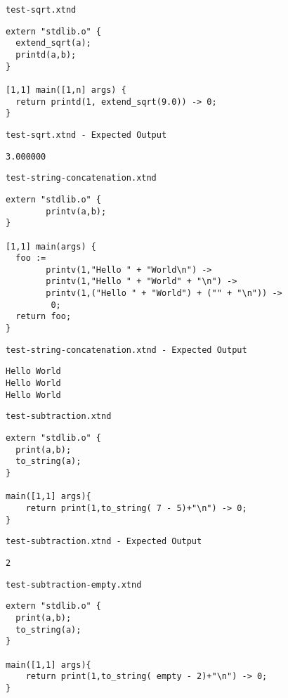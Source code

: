 \medskip \noindent \texttt{test-sqrt.xtnd}


\begin{lstlisting}
extern "stdlib.o" {
  extend_sqrt(a);
  printd(a,b);
}

[1,1] main([1,n] args) {
  return printd(1, extend_sqrt(9.0)) -> 0;
}
\end{lstlisting}


\medskip \noindent \texttt{test-sqrt.xtnd - Expected Output}


\begin{lstlisting}
3.000000
\end{lstlisting}


\medskip \noindent \texttt{test-string-concatenation.xtnd}


\begin{lstlisting}
extern "stdlib.o" {
		printv(a,b);
}

[1,1] main(args) {
  foo :=
		printv(1,"Hello " + "World\n") ->
		printv(1,"Hello " + "World" + "\n") ->
		printv(1,("Hello " + "World") + ("" + "\n")) ->
		 0;
  return foo;
}
\end{lstlisting}


\medskip \noindent \texttt{test-string-concatenation.xtnd - Expected Output}


\begin{lstlisting}
Hello World
Hello World
Hello World
\end{lstlisting}


\medskip \noindent \texttt{test-subtraction.xtnd}


\begin{lstlisting}
extern "stdlib.o" {
  print(a,b);
  to_string(a);
}

main([1,1] args){
	return print(1,to_string( 7 - 5)+"\n") -> 0;
}
\end{lstlisting}


\medskip \noindent \texttt{test-subtraction.xtnd - Expected Output}


\begin{lstlisting}
2
\end{lstlisting}


\medskip \noindent \texttt{test-subtraction-empty.xtnd}


\begin{lstlisting}
extern "stdlib.o" {
  print(a,b);
  to_string(a);
}

main([1,1] args){
	return print(1,to_string( empty - 2)+"\n") -> 0;
}
\end{lstlisting}


